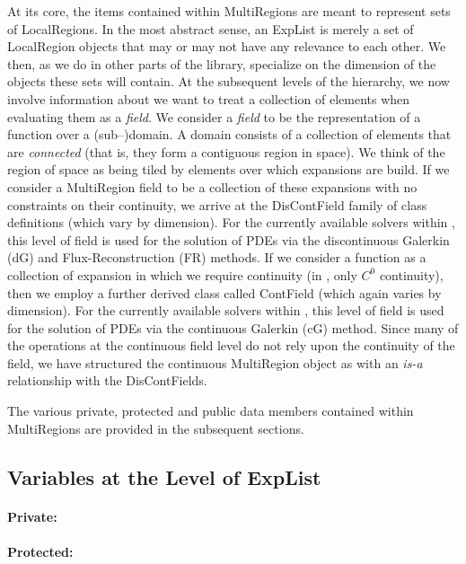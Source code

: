 At its core, the items contained within MultiRegions are meant to represent sets of LocalRegions.  In the most abstract sense, an 
ExpList is merely a set of LocalRegion objects that may or may not have any relevance to each other.   We then, as we do in 
other parts of the library, specialize on the dimension of the objects these sets will contain.  At the subsequent levels of the
hierarchy, we now involve information about we want to treat a collection of elements when evaluating them as a {\em field}.  
We consider a {\em field} to be the representation of a function over a (sub--)domain.  A domain consists of a collection of elements
that are {\em connected} (that is, they form a contiguous region in space).   We think of the region of space as being tiled by elements
over which expansions are build.  If we consider a MultiRegion field to be a collection of these expansions with no constraints on their
continuity, we arrive at the DisContField family of class definitions (which vary by dimension).  For the currently available solvers within
{\nek}, this level of field is used for the solution of PDEs via the discontinuous Galerkin (dG) and Flux-Reconstruction (FR) methods.
If we consider a function as a collection of expansion in which we require continuity (in {\nek}, only $C^0$ continuity), then we employ
a further derived class called ContField (which again varies by dimension).  For the currently available solvers
within {\nek}, this level of field is used for the solution of PDEs via the continuous Galerkin (cG) method.
Since many of the operations at the continuous field level do not rely upon the continuity of the field, we have structured the
continuous MultiRegion object as with an {\em is-a} relationship with the DisContFields.

The various private, protected and public data members contained within MultiRegions are provided in the subsequent sections.


\subsection{Variables at the Level of ExpList}

\paragraph{Private:}

\paragraph{Protected:}

